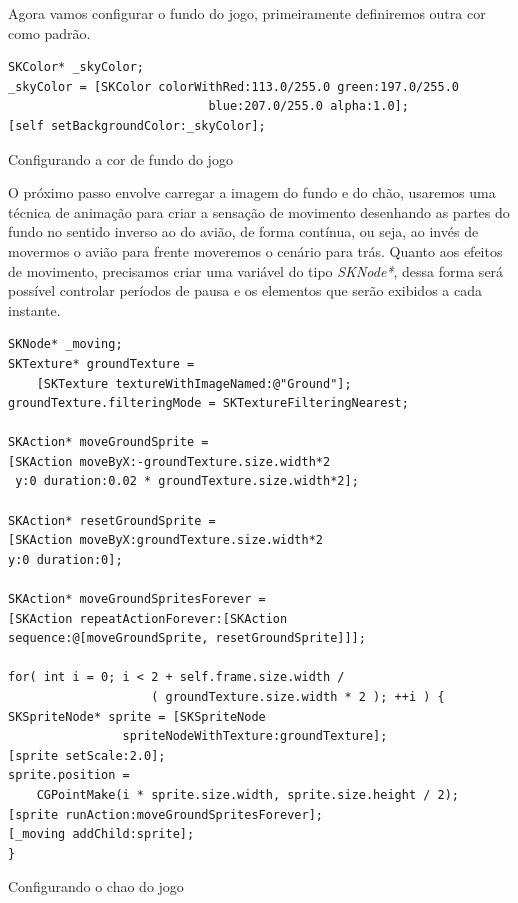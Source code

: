 \documentclass[a4paper,12pt,brazil,doubleside]{book}
\begin{document}
\begin{singlespace}
Agora vamos configurar o fundo do jogo, primeiramente definiremos outra cor como padrão.

\begin{listing}[H]
\begin{verbatim}
SKColor* _skyColor;
_skyColor = [SKColor colorWithRed:113.0/255.0 green:197.0/255.0 
							blue:207.0/255.0 alpha:1.0];
[self setBackgroundColor:_skyColor];
\end{verbatim}
\caption{Configurando a cor de fundo do jogo}
\end{listing}

O próximo passo envolve carregar a imagem do fundo e do chão, usaremos uma técnica de animação para criar a sensação de movimento desenhando as partes do fundo no sentido inverso ao do avião, de forma contínua, ou seja, ao invés de movermos o avião para frente moveremos o cenário para trás.
Quanto aos efeitos de movimento, precisamos criar uma variável do tipo \emph{SKNode*}, dessa forma será possível controlar períodos de pausa e os elementos que serão exibidos a cada instante.

\begin{listing}[H]
\begin{verbatim}
SKNode* _moving;
SKTexture* groundTexture = 
	[SKTexture textureWithImageNamed:@"Ground"];
groundTexture.filteringMode = SKTextureFilteringNearest;
        
SKAction* moveGroundSprite = 
[SKAction moveByX:-groundTexture.size.width*2
 y:0 duration:0.02 * groundTexture.size.width*2];
 
SKAction* resetGroundSprite = 
[SKAction moveByX:groundTexture.size.width*2 
y:0 duration:0];

SKAction* moveGroundSpritesForever = 
[SKAction repeatActionForever:[SKAction 
sequence:@[moveGroundSprite, resetGroundSprite]]];
           
for( int i = 0; i < 2 + self.frame.size.width / 
					( groundTexture.size.width * 2 ); ++i ) {
SKSpriteNode* sprite = [SKSpriteNode 
				spriteNodeWithTexture:groundTexture];
[sprite setScale:2.0];
sprite.position = 
	CGPointMake(i * sprite.size.width, sprite.size.height / 2);
[sprite runAction:moveGroundSpritesForever];
[_moving addChild:sprite];
}
\end{verbatim}
\caption{Configurando o chao do jogo}
\end{listing}


\end{singlespace}
\end{document}

